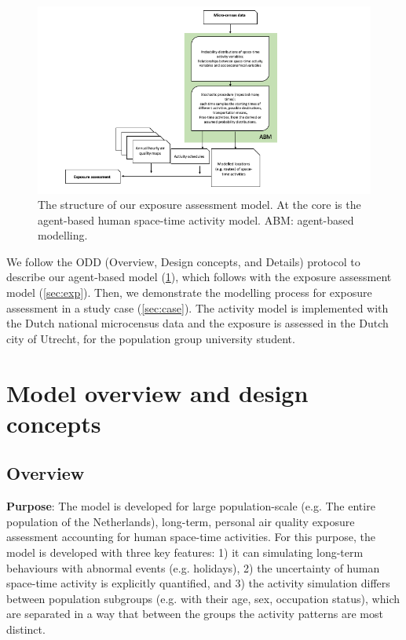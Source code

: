 \documentclass[]{article}
\begin{document}
\begin{figure}
    \centering
    \includegraphics[width=\linewidth]{figure/exposureflow.png}
    \caption{The structure of our exposure assessment model. At the core is the agent-based human space-time activity model. ABM: agent-based modelling. }
    \label{fig:expflow}
\end{figure}



We follow the ODD (Overview, Design concepts, and Details) protocol \citep[][page 37,]{railsback2019agent} to describe our agent-based model (\cref{sec:model}), which follows with the exposure assessment model (\cref{sec:exp}). Then, we demonstrate the modelling process for exposure assessment in a study case (\cref{sec:case}). The activity model is implemented with the Dutch national microcensus data and the exposure is assessed in the Dutch city of Utrecht, for the population group university student.  %


\section{Model overview and design concepts }
\label{sec:model}

\subsection{Overview} 

\textbf{Purpose}:
The model is developed for large population-scale (e.g. The entire population of the Netherlands), long-term, personal air quality exposure assessment accounting for human space-time activities. For this purpose, the model is developed with three key features: 1) it can simulating long-term behaviours with abnormal events (e.g. holidays), 2) the uncertainty of human space-time activity is explicitly quantified, and 3) the activity simulation differs between population subgroups (e.g. with their age, sex, occupation status), which are separated in a way that between the groups the activity patterns are most distinct. %
\end{document}
